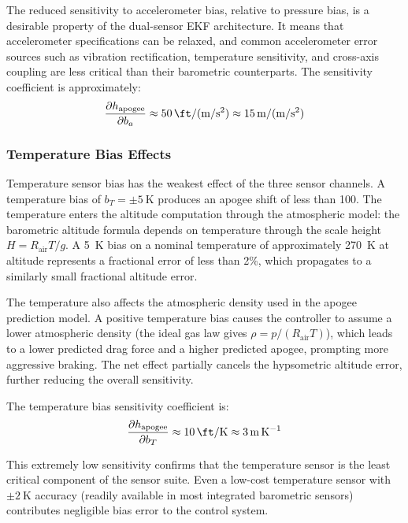 \documentclass[11pt,letterpaper]{article}
\begin{document}
The reduced sensitivity to accelerometer bias, relative to pressure bias, is a desirable property of the dual-sensor EKF architecture. It means that accelerometer specifications can be relaxed, and common accelerometer error sources such as vibration rectification, temperature sensitivity, and cross-axis coupling are less critical than their barometric counterparts. The sensitivity coefficient is approximately:
\begin{equation}
    \frac{\partial h_{\text{apogee}}}{\partial b_a} \approx \SI{50}{\ft\per(\metre\per\second\squared)} \approx \SI{15}{\metre\per(\metre\per\second\squared)}
    \label{eq:accel_sensitivity}
\end{equation}

\subsubsection{Temperature Bias Effects}

Temperature sensor bias has the weakest effect of the three sensor channels. A temperature bias of $b_T = \pm\SI{5}{\kelvin}$ produces an apogee shift of less than \SI{100}{\ft}. The temperature enters the altitude computation through the atmospheric model: the barometric altitude formula depends on temperature through the scale height $H = R_{\text{air}} T / g$. A \SI{5}{\kelvin} bias on a nominal temperature of approximately \SI{270}{\kelvin} at altitude represents a fractional error of less than 2\%, which propagates to a similarly small fractional altitude error.

The temperature also affects the atmospheric density used in the apogee prediction model. A positive temperature bias causes the controller to assume a lower atmospheric density (the ideal gas law gives $\rho = p / (R_{\text{air}} T)$), which leads to a lower predicted drag force and a higher predicted apogee, prompting more aggressive braking. The net effect partially cancels the hypsometric altitude error, further reducing the overall sensitivity.

The temperature bias sensitivity coefficient is:
\begin{equation}
    \frac{\partial h_{\text{apogee}}}{\partial b_T} \approx \SI{10}{\ft\per\kelvin} \approx \SI{3}{\metre\per\kelvin}
    \label{eq:temp_sensitivity}
\end{equation}

This extremely low sensitivity confirms that the temperature sensor is the least critical component of the sensor suite. Even a low-cost temperature sensor with $\pm\SI{2}{\kelvin}$ accuracy (readily available in most integrated barometric sensors) contributes negligible bias error to the control system.
\end{document}
